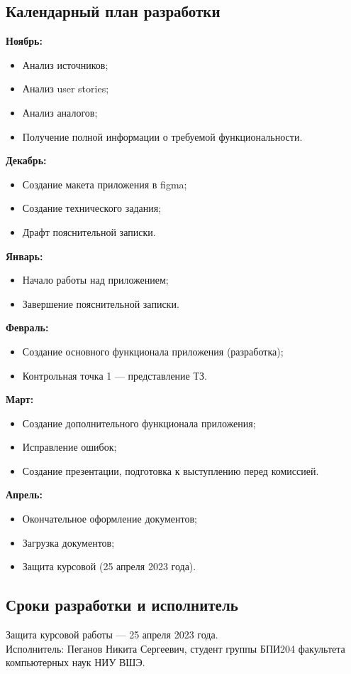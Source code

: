\documentclass[draft]{article}
\begin{document}
\subsection{Календарный план разработки}
\textbf{Ноябрь:}
\begin{itemize}
\item Анализ источников;
\item Анализ user stories;
\item Анализ аналогов;
\item Получение полной информации о требуемой функциональности.
\end{itemize}
\textbf{Декабрь:}
\begin{itemize}
\item Создание макета приложения в figma;
\item Создание технического задания;
\item Драфт пояснительной записки.
\end{itemize}
\textbf{Январь:}
\begin{itemize}
\item Начало работы над приложением;
\item Завершение пояснительной записки.
\end{itemize}
\textbf{Февраль:}
\begin{itemize}
\item Создание основного функционала приложения (разработка);
\item Контрольная точка 1 — представление ТЗ.
\end{itemize}
\textbf{Март:}
\begin{itemize}
\item Создание дополнительного функционала приложения;
\item Исправление ошибок;
\item Создание презентации, подготовка к выступлению перед комиссией.
\end{itemize}
\textbf{Апрель:}
\begin{itemize}
\item Окончательное оформление документов;
\item Загрузка документов;
\item Защита курсовой (25 апреля 2023 года).
\end{itemize}
\subsection{Сроки разработки и исполнитель}
Защита курсовой работы — 25 апреля 2023 года.\\
Исполнитель: Пеганов Никита Сергеевич, студент группы БПИ204 факультета компьютерных наук НИУ ВШЭ.
\newpage
\end{document}
